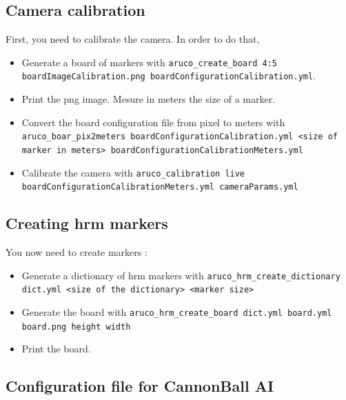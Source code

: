 \documentclass[a4paper,11pt]{report}
\begin{document}
\subsection{Camera calibration}
\label{subsec:cam}

First, you need to calibrate the camera. In order to do that, \begin{itemize}

    \item Generate a board of markers with \texttt{aruco\_create\_board 4:5
        boardImageCalibration.png boardConfigurationCalibration.yml}.

    \item Print the png image. Mesure in meters the size of a marker.

    \item Convert the board configuration file from pixel to meters with
        \texttt{aruco\_boar\_pix2meters boardConfigurationCalibration.yml <size
        of marker in meters> boardConfigurationCalibrationMeters.yml}

    \item Calibrate the camera with \texttt{aruco\_calibration live
        boardConfigurationCalibrationMeters.yml cameraParams.yml}

\end{itemize}

\subsection{Creating hrm markers}
\label{subsec:dic}

You now need to create markers : \begin{itemize}

    \item Generate a dictionary of hrm markers with
        \texttt{aruco\_hrm\_create\_dictionary dict.yml <size of the
        dictionary> <marker size>}

    \item Generate the board with \texttt{aruco\_hrm\_create\_board dict.yml
        board.yml board.png height width}

    \item Print the board.

\end{itemize}

\subsection{Configuration file for CannonBall AI}
\label{subsec:doorsfile}
\end{document}
